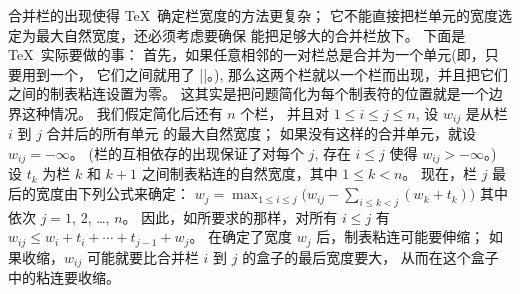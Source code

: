 {{%
\bigskip\medskip
\ddanger 合并栏的出现使得 \TeX\ 确定栏宽度的方法更复杂；
它不能直接把栏单元的宽度选定为最大自然宽度，还必须考虑要确保%
能把足够大的合并栏放下。%
下面是 \TeX\ 实际要做的事：
首先，如果任意相邻的一对栏总是合并为一个单元(即，只要用到一个，
它们之间就用了 |\span|。),
那么这两个栏就以一个栏而出现，并且把它们之间的制表粘连设置为零。%
这其实是把问题简化为每个制表符的位置就是一个边界这种情况。%
我们假定简化后还有 $n$ 个栏，
并且对 $1\le i\le j\le n$, 设 $w_{ij}$ 是从栏 $i$ 到 $j$ 合并后的所有单元%
的最大自然宽度；
如果没有这样的合并单元，就设$w_{ij}=-\infty$。%
(栏的互相依存的出现保证了对每个 $j$, 存在 $i\le j$ 使得 $w_{ij}>-\infty$。)
设 $t_k$ 为栏 $k$ 和 $k+1$ 之间制表粘连的自然宽度，其中 $1\le k<n$。%
现在，栏 $j$ 最后的宽度由下列公式来确定：
\begindisplay
$\displaystyle w_j=\max_{1\le i\le j}\textstyle\bigl(w_{ij}
  -\sum_{i\le k<j}(w_k+t_k)\bigr)$
\enddisplay
其中依次 $j=1$, 2, \dots, $n$。%
因此，如所要求的那样，对所有 $i\le j$ 有 $w_{ij}\le w_i+t_i+\cdots+t_{j-1}+w_j$。%
在确定了宽度 $w_j$ 后，制表粘连可能要伸缩；
如果收缩，$w_{ij}$ 可能就要比合并栏 $i$ 到 $j$ 的盒子的最后宽度要大，
从而在这个盒子中的粘连要收缩。

}}
